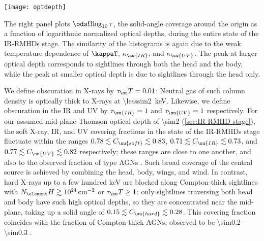 \documentclass[twocolumn]{article}
\newcommand*\xray{\texorpdfstring{X\protect\nobreakdash-ray}{X-ray}}
\newcommand*\xrays{\xray s}
\newcommand*\irrmhd{\ac{IR}\protect\nobreakdash-\acp{RMHD}}
\begin{document}
\begin{figure*}
\texttt{[image: optdepth]}
\caption{\textit{Left panel:} Plot of normalized optical depths
(\cref{sec:obscuration}) along sightlines of varying latitudes in the \irrmhd{}
stage at $t=14\,t_0$. The thick curve is the azimuthal average, and the shaded
area is the range covered by all azimuthal angles. \textit{Right panel:}
Histograms of the solid angle around the origin occupied by gas columns with
normalized optical depths in each logarithmic bin in the 
state of the \irrmhd{} stage. \textit{Both panels:} Curves for \ac{IR} and
\ac{UV} are identical. Dotted lines indicate optical depth of unity at each
frequency.}
\label{fig:optical depths}
\end{figure*}

The right panel plots $\ods\Omega{\log_{10}\tau}$, the solid-angle coverage
around the origin as a function of logarithmic normalized optical depths,
during the entire  state of the \irrmhd{} stage. The
similarity of the histograms is again due to the weak temperature dependence of
$\kappaT$, $\kappa_\su{IR}$, and $\kappa_\su{UV}$. The peak at larger optical
depth corresponds to sightlines through both the head and the body, while the
peak at smaller optical depth is due to sightlines through the head only.

We define obscuration in \xrays{} by $\tau_\su T=0.01$: Neutral gas of such
column density is optically thick to \xrays{} at
\SI{\lesssim2}{\kilo\electronvolt}. Likewise, we define obscuration in the
\ac{IR} and \ac{UV} by $\tau_\su{IR}=1$ and $\tau_\su{UV}=1$ respectively. For
our assumed mid-plane Thomson optical depth of \num{\sim2} (\cref{sec:IR-RMHD
stage}), the soft \xray, \ac{IR}, and \ac{UV} covering fractions in the
 state of the \irrmhd{} stage fluctuate within the ranges
$0.78\lesssim C_\su{soft}\lesssim0.83$, $0.71\lesssim C_\su{IR}\lesssim0.73$,
and $0.77\lesssim C_\su{UV}\lesssim0.82$ respectively; these ranges are close
to one another, and also to the observed fraction of type
\acp{AGN} \citep[e.g.,][]{2010ApJ...714..561L}. Such broad coverage of the
central source is achieved by combining the head, body, wings, and wind. In
contrast, hard \xrays{} up to a few hundred \si{\kilo\electronvolt} are blocked
along Compton-thick sightlines with $N_\element
H\gtrsim\SI{e24}{\per\centi\meter\squared}$ or $\tau_\su T\ge1$; only
sightlines traversing both head and body have such high optical depths, so they
are concentrated near the mid-plane, taking up a solid angle of $0.15\lesssim
C_\su{hard}\lesssim0.28$. This covering fraction coincides with the fraction of
Compton-thick \acp{AGN}, observed to be \numrange{\sim0.2}{\sim0.3}
\citep[e.g.,][]{2015ApJ...815L..13R, 2016ApJ...825...85K}.
\end{document}
